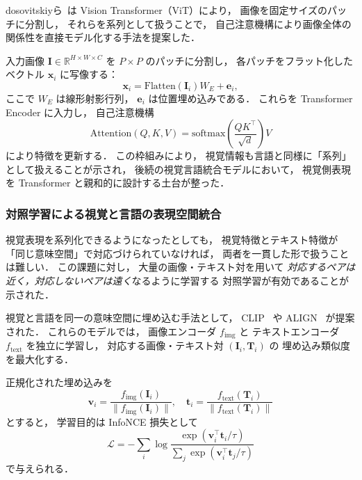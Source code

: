 \documentclass[a4j,12pt,dvipdfmx]{jsreport}
\begin{document}
dosovitskiyら~\cite{dosovitskiy2021vit}は Vision Transformer（ViT）により，
画像を固定サイズのパッチに分割し，
それらを系列として扱うことで，
自己注意機構により画像全体の関係性を直接モデル化する手法を提案した．

入力画像 $\mathbf{I}\in\mathbb{R}^{H\times W\times C}$ を
$P\times P$ のパッチに分割し，
各パッチをフラット化したベクトル $\mathbf{x}_i$ に写像する：
\begin{equation}
   \mathbf{x}_i = \mathrm{Flatten}(\mathbf{I}_i) W_E + \mathbf{e}_i,
\end{equation}
ここで $W_E$ は線形射影行列，
$\mathbf{e}_i$ は位置埋め込みである．
これらを Transformer Encoder に入力し，
自己注意機構
\begin{equation}
   \mathrm{Attention}(Q,K,V)
   =
   \mathrm{softmax}
   \left(
   \frac{QK^\top}{\sqrt{d}}
   \right)V
\end{equation}
により特徴を更新する．
この枠組みにより，
視覚情報も言語と同様に「系列」として扱えることが示され，
後続の視覚言語統合モデルにおいて，
視覚側表現を Transformer と親和的に設計する土台が整った．

\subsubsection{対照学習による視覚と言語の表現空間統合}

視覚表現を系列化できるようになったとしても，
視覚特徴とテキスト特徴が「同じ意味空間」で対応づけられていなければ，
両者を一貫した形で扱うことは難しい．
この課題に対し，
大量の画像・テキスト対を用いて
\emph{対応するペアは近く，対応しないペアは遠く}なるように学習する
対照学習が有効であることが示された．

視覚と言語を同一の意味空間に埋め込む手法として，
CLIP~\cite{radford_learning_2021-2} や
ALIGN~\cite{jia2021align} が提案された．
これらのモデルでは，
画像エンコーダ $f_{\mathrm{img}}$ と
テキストエンコーダ $f_{\mathrm{text}}$ を独立に学習し，
対応する画像・テキスト対 $(\mathbf{I}_i, \mathbf{T}_i)$ の
埋め込み類似度を最大化する．

正規化された埋め込みを
\begin{equation}
   \mathbf{v}_i =
   \frac{f_{\mathrm{img}}(\mathbf{I}_i)}{\|f_{\mathrm{img}}(\mathbf{I}_i)\|},
   \quad
   \mathbf{t}_i =
   \frac{f_{\mathrm{text}}(\mathbf{T}_i)}{\|f_{\mathrm{text}}(\mathbf{T}_i)\|}
\end{equation}
とすると，
学習目的は InfoNCE 損失として
\begin{equation}
   \mathcal{L}
   =
   -\sum_i
   \log
   \frac{
      \exp(\mathbf{v}_i^\top \mathbf{t}_i / \tau)
   }{
      \sum_j \exp(\mathbf{v}_i^\top \mathbf{t}_j / \tau)
   }
\end{equation}
で与えられる．
\end{document}
